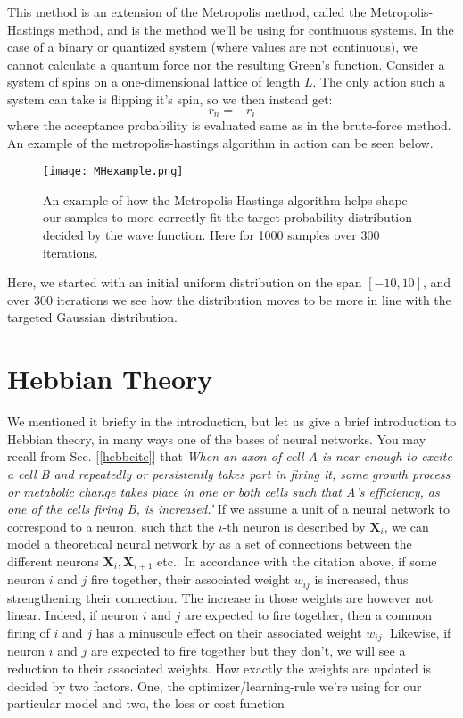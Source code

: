 \documentclass[12pt]{article}
\begin{document}
{This method is an extension of the Metropolis method, called the Metropolis-Hastings method, and is the method we'll be using for continuous systems. \newline
In the case of a binary or quantized system (where values are not continuous), we cannot calculate a quantum force nor the resulting Green's function. Consider a system of spins on a one-dimensional lattice of length $L$. The only action such a system can take is flipping it's spin, so we then instead get:
\begin{equation*}
    r_n = -r_i
\end{equation*}
where the acceptance probability is evaluated same as in the brute-force method.
\newline
An example of the metropolis-hastings algorithm in action can be seen below.
\begin{figure}[ht!]
    \centering
    \texttt{[image: MHexample.png]}
    \caption{An example of how the Metropolis-Hastings algorithm helps shape our samples to more correctly fit the target probability distribution decided by the wave function. Here for 1000 samples over 300 iterations.}
    \label{fig:mh}
\end{figure}
\newline
Here, we started with an initial uniform distribution on the span $[-10, 10]$, and over 300 iterations we see how the distribution moves to be more in line with the targeted Gaussian distribution.
\newpage
\section{Hebbian Theory}
We mentioned it briefly in the introduction, but let us give a brief introduction to Hebbian theory, in many ways one of the bases of neural networks. You may recall from Sec. [\ref{hebbcite}] that \newline
\textit{\textcolor{direct-cite}{When an axon of cell A is near enough to
excite a cell B and repeatedly or persistently takes part in firing it, some growth process or metabolic
change takes place in one or both cells such that A’s efficiency, as one of the cells firing B, is increased.’}} \newline
If we assume a unit of a neural network to correspond to a neuron, such that the $i$-th neuron is described by $\boldsymbol{X}_i$, we can model a theoretical neural network by as a set of connections between the different neurons $\boldsymbol{X}_i, \boldsymbol{X}_{i+1}$ etc.. In accordance with the citation above, if some neuron $i$ and $j$ fire together, their associated weight $w_{ij}$ is increased, thus strengthening their connection. The increase in those weights are however not linear. Indeed, if neuron $i$ and $j$ are expected to fire together, then a common firing of $i$ and $j$ has a minuscule effect on their associated weight $w_{ij}$. Likewise, if neuron $i$ and $j$ are expected to fire together but they don't, we will see a reduction to their associated weights. \newline
How exactly the weights are updated is decided by two factors. One, the optimizer/learning-rule we're using for our particular model and two, the loss or cost function
}
\end{document}
